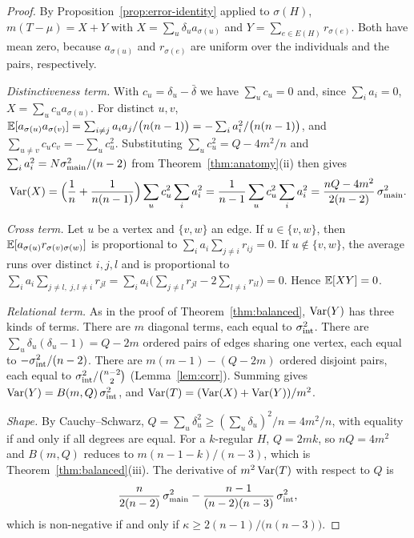 \begin{proof}
By Proposition~\ref{prop:error-identity} applied to $\sigma(H)$,
$m(T-\mu)=X+Y$ with $X=\sum_u\delta_u a_{\sigma(u)}$ and $Y=\sum_{e\in E(H)}r_{\sigma(e)}$.
Both have mean zero, because $a_{\sigma(u)}$ and $r_{\sigma(e)}$ are uniform over
the individuals and the pairs, respectively.

\emph{Distinctiveness term.} With $c_u=\delta_u-\bar\delta$ we have $\sum_uc_u=0$ and,
since $\sum_ia_i=0$, $X=\sum_uc_ua_{\sigma(u)}$. For distinct $u,v$,
$\mathbb{E}[a_{\sigma(u)}a_{\sigma(v)}]=\sum_{i\ne j}a_ia_j/\bigl(n(n-1)\bigr)=-\sum_ia_i^2/\bigl(n(n-1)\bigr)$,
and $\sum_{u\ne v}c_uc_v=-\sum_uc_u^2$. Substituting
$\sum_uc_u^2=Q-4m^2/n$ and $\sum_ia_i^2=N\sigma^2_{\mathrm{main}}/(n-2)$ from
Theorem~\ref{thm:anatomy}(ii) then gives
\[
\operatorname{Var}(X)=\Big(\frac1n+\frac{1}{n(n-1)}\Big)\sum_uc_u^2\sum_ia_i^2
=\frac{1}{n-1}\sum_uc_u^2\sum_ia_i^2=\frac{nQ-4m^2}{2(n-2)}\,\sigma^2_{\mathrm{main}} .
\]

\emph{Cross term.} Let $u$ be a vertex and $\{v,w\}$ an edge. If $u\in\{v,w\}$,
then $\mathbb{E}[a_{\sigma(u)}r_{\sigma(v)\sigma(w)}]$ is proportional to $\sum_ia_i\sum_{j\ne i}r_{ij}=0$.
If $u\notin\{v,w\}$, the average runs over distinct $i,j,l$ and is proportional to
$\sum_ia_i\sum_{j\ne l,\;j,l\ne i}r_{jl}=\sum_ia_i\big(\sum_{j\neq l}r_{jl}-2\sum_{l\ne i}r_{il}\big)=0$.
Hence $\mathbb{E}[XY]=0$.

\emph{Relational term.} As in the proof of Theorem~\ref{thm:balanced},
$\operatorname{Var}(Y)$ has three kinds of terms. There are $m$ diagonal terms, each equal to
$\sigma^2_{\mathrm{int}}$. There are $\sum_u\delta_u(\delta_u-1)=Q-2m$ ordered pairs of edges
sharing one vertex, each equal to $-\sigma^2_{\mathrm{int}}/(n-2)$. There are $m(m-1)-(Q-2m)$
ordered disjoint pairs, each equal to $\sigma^2_{\mathrm{int}}/\binom{n-2}{2}$
(Lemma~\ref{lem:corr}). Summing gives $\operatorname{Var}(Y)=B(m,Q)\,\sigma^2_{\mathrm{int}}$, and
$\operatorname{Var}(T)=(\operatorname{Var}(X)+\operatorname{Var}(Y))/m^2$.

\emph{Shape.} By Cauchy--Schwarz, $Q=\sum_u\delta_u^2\ge(\sum_u\delta_u)^2/n=4m^2/n$,
with equality if and only if all degrees are equal. For a $k$-regular $H$,
$Q=2mk$, so $nQ=4m^2$ and $B(m,Q)$ reduces to $m(n-1-k)/(n-3)$, which is Theorem~\ref{thm:balanced}(iii).
The derivative of $m^2\operatorname{Var}(T)$ with respect to $Q$ is
\[
\frac{n}{2(n-2)}\,\sigma^2_{\mathrm{main}}-\frac{n-1}{(n-2)(n-3)}\,\sigma^2_{\mathrm{int}} ,
\]
which is non-negative if and only if $\kappa\ge2(n-1)/\bigl(n(n-3)\bigr)$.
\end{proof}


